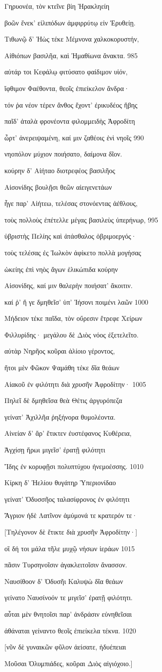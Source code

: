 Γηρυονέα, τὸν κτεῖνε βίη Ἡρακληείη

βοῶν ἕνεκ' εἰλιπόδων ἀμφιρρύτῳ εἰν Ἐρυθείῃ.

Τιθωνῷ δ' Ἠὼς τέκε Μέμνονα χαλκοκορυστήν,

Αἰθιόπων βασιλῆα, καὶ Ἠμαθίωνα ἄνακτα. 985

αὐτάρ τοι Κεφάλῳ φιτύσατο φαίδιμον υἱόν, 

ἴφθιμον Φαέθοντα, θεοῖς ἐπιείκελον ἄνδρα· 

τόν ῥα νέον τέρεν ἄνθος ἔχοντ' ἐρικυδέος ἥβης

παῖδ' ἀταλὰ φρονέοντα φιλομμειδὴς Ἀφροδίτη

ὦρτ' ἀνερειψαμένη, καί μιν ζαθέοις ἐνὶ νηοῖς 990 

νηοπόλον μύχιον ποιήσατο, δαίμονα δῖον. 

κούρην δ' Αἰήταο διοτρεφέος βασιλῆος

Αἰσονίδης βουλῇσι θεῶν αἰειγενετάων

ἦγε παρ' Αἰήτεω, τελέσας στονόεντας ἀέθλους,

τοὺς πολλοὺς ἐπέτελλε μέγας βασιλεὺς ὑπερήνωρ, 995

ὑβριστὴς Πελίης καὶ ἀτάσθαλος ὀβριμοεργός· 

τοὺς τελέσας ἐς Ἰωλκὸν ἀφίκετο πολλὰ μογήσας

ὠκείης ἐπὶ νηὸς ἄγων ἑλικώπιδα κούρην

Αἰσονίδης, καί μιν θαλερὴν ποιήσατ' ἄκοιτιν.

καί ῥ' ἥ γε δμηθεῖσ' ὑπ' Ἰήσονι ποιμένι λαῶν 1000 

Μήδειον τέκε παῖδα, τὸν οὔρεσιν ἔτρεφε Χείρων

Φιλλυρίδης· μεγάλου δὲ Διὸς νόος ἐξετελεῖτο. 

αὐτὰρ Νηρῆος κοῦραι ἁλίοιο γέροντος,

ἤτοι μὲν Φῶκον Ψαμάθη τέκε δῖα θεάων

Αἰακοῦ ἐν φιλότητι διὰ χρυσῆν Ἀφροδίτην· 1005 

Πηλεῖ δὲ δμηθεῖσα θεὰ Θέτις ἀργυρόπεζα

γείνατ' Ἀχιλλῆα ῥηξήνορα θυμολέοντα.

Αἰνείαν δ' ἄρ' ἔτικτεν ἐυστέφανος Κυθέρεια,

Ἀγχίσῃ ἥρωι μιγεῖσ' ἐρατῇ φιλότητι 

Ἴδης ἐν κορυφῇσι πολυπτύχου ἠνεμοέσσης. 1010

Κίρκη δ' Ἠελίου θυγάτηρ Ὑπεριονίδαο

γείνατ' Ὀδυσσῆος ταλασίφρονος ἐν φιλότητι

Ἄγριον ἠδὲ Λατῖνον ἀμύμονά τε κρατερόν τε· 

{[}Τηλέγονον δὲ ἔτικτε διὰ χρυσῆν Ἀφροδίτην·{]}

οἳ δή τοι μάλα τῆλε μυχῷ νήσων ἱεράων 1015

πᾶσιν Τυρσηνοῖσιν ἀγακλειτοῖσιν ἄνασσον.

Ναυσίθοον δ' Ὀδυσῆι Καλυψὼ δῖα θεάων

γείνατο Ναυσίνοόν τε μιγεῖσ' ἐρατῇ φιλότητι. 

αὗται μὲν θνητοῖσι παρ' ἀνδράσιν εὐνηθεῖσαι

ἀθάναται γείναντο θεοῖς ἐπιείκελα τέκνα. 1020

{[}νῦν δὲ γυναικῶν φῦλον ἀείσατε, ἡδυέπειαι

Μοῦσαι Ὀλυμπιάδες, κοῦραι Διὸς αἰγιόχοιο.{]}
